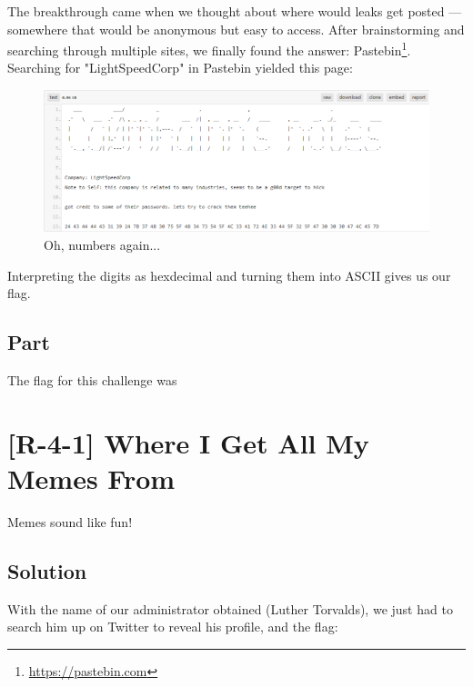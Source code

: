 		The breakthrough came when we thought about where would leaks get posted --- somewhere that would be anonymous but
		easy to access. After brainstorming and searching through multiple sites, we finally found the answer:
		Pastebin\footnote{\url{https://pastebin.com}}. Searching for "LightSpeedCorp" in Pastebin yielded this page:

		\begin{figure}[!htbp]\centering
			\includegraphics[width=130mm]{figures/osintred/r31.png} \vspace{5mm}
			\caption{Oh, numbers again...}
		\end{figure}

		Interpreting the digits as hexdecimal and turning them into ASCII gives us our flag.


	\subsection{Part}
		The flag for this challenge was 




\pagebreak
\section{[R-4-1] Where I Get All My Memes From}

	Memes sound like fun!

	\subsection{Solution}

		With the name of our administrator obtained (Luther Torvalds), we just had to search him up on Twitter to reveal
		his profile, and the flag:

